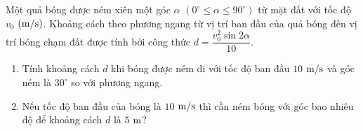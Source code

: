 \begin{ex}%
	Một quả bóng được ném xiên một góc $\alpha$ $\left( 0^\circ \le \alpha \le 90^\circ \right)$  từ mặt đất với tốc độ $v_0$ $\rm\left(m/s\right)$. Khoảng cách theo phương ngang từ vị trí ban đầu của quả bóng đến vị trí bóng chạm đất được tính bởi công thức $d=\dfrac{v_0^2\sin2\alpha}{10}$.
	\begin{enumerate}
		\item Tính khoảng cách $d$ khi bóng được ném đi với tốc độ ban đầu $10$ $\rm m/s$ và góc ném là $30^\circ$  so với phương ngang.
		\item Nếu tốc độ ban đầu của bóng là $10$ $\rm m/s$ thì cần  ném bóng với góc bao nhiêu độ để khoảng cách $d$ là $5$ $\rm m$?
	\end{enumerate}
\end{ex}

